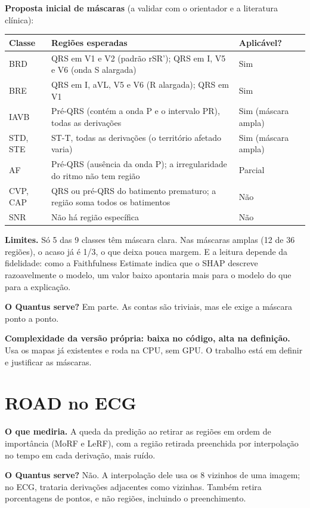 \documentclass[11pt,a4paper]{article}
\begin{document}
\textbf{Proposta inicial de máscaras} (a validar com o orientador e a literatura clínica):
\begin{center}\small
\begin{tabularx}{\linewidth}{lXl}
\toprule
\textbf{Classe} & \textbf{Regiões esperadas} & \textbf{Aplicável?} \\
\midrule
BRD & QRS em V1 e V2 (padrão rSR'); QRS em I, V5 e V6 (onda S alargada) & Sim \\
BRE & QRS em I, aVL, V5 e V6 (R alargada); QRS em V1 & Sim \\
IAVB & Pré-QRS (contém a onda P e o intervalo PR), todas as derivações & Sim (máscara ampla) \\
STD, STE & ST-T, todas as derivações (o território afetado varia) & Sim (máscara ampla) \\
AF & Pré-QRS (ausência da onda P); a irregularidade do ritmo não tem região & Parcial \\
CVP, CAP & QRS ou pré-QRS do batimento prematuro; a região soma todos os batimentos & Não \\
SNR & Não há região específica & Não \\
\bottomrule
\end{tabularx}
\end{center}

\textbf{Limites.} Só 5 das 9 classes têm máscara clara. Nas máscaras amplas (12 de 36 regiões), o acaso já é 1/3, o que deixa pouca margem. E a leitura depende da fidelidade: como a Faithfulness Estimate indica que o SHAP descreve razoavelmente o modelo, um valor baixo apontaria mais para o modelo do que para a explicação.

\textbf{O Quantus serve?} Em parte. As contas são triviais, mas ele exige a máscara ponto a ponto.

\textbf{Complexidade da versão própria: baixa no código, alta na definição.} Usa os mapas já existentes e roda na CPU, sem GPU. O trabalho está em definir e justificar as máscaras.

\section{ROAD no ECG}
\textbf{O que mediria.} A queda da predição ao retirar as regiões em ordem de importância (MoRF e LeRF), com a região retirada preenchida por interpolação no tempo em cada derivação, mais ruído.

\textbf{O Quantus serve?} Não. A interpolação dele usa os 8 vizinhos de uma imagem; no ECG, trataria derivações adjacentes como vizinhas. Também retira porcentagens de pontos, e não regiões, incluindo o preenchimento.
\end{document}
